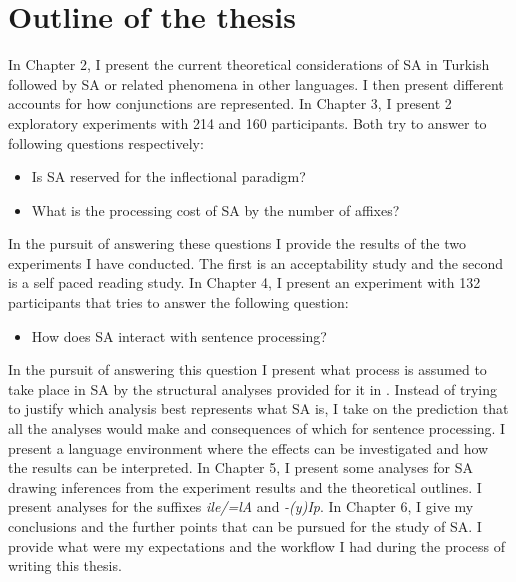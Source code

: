 \section{Outline of the thesis}

In Chapter 2, I present the current theoretical considerations of SA in Turkish followed by SA or related phenomena in other languages. I then present different accounts for how conjunctions are represented. In Chapter 3, I present 2 exploratory experiments with 214 and 160 participants. Both try to answer to following questions respectively:

\begin{itemize}
    \item Is SA reserved for the inflectional paradigm?
    \item What is the processing cost of SA by the number of affixes?
\end{itemize}

In the pursuit of answering these questions I provide the results of the two experiments I have conducted.
The first is an acceptability study and the second is a self paced reading study. In Chapter 4, I present an experiment with 132 participants that tries to answer the following question:
\begin{itemize}
    \item How does SA interact with sentence processing?
\end{itemize}
In the pursuit of answering this question I present what process is assumed to take place in SA by the structural analyses provided for it in \cite{broadwell2008turkish,kornfilt2012revisiting,guseva2017postsyntactic,erschler2018suspended}. Instead of trying to justify which analysis best represents what SA is, I take on the prediction that all the analyses would make and consequences of which for sentence processing. I present a language environment where the effects can be investigated and how the results can be interpreted. In Chapter 5, I present some analyses for SA drawing inferences from the experiment results and the theoretical outlines. I present analyses for the suffixes \textit{ile/=lA} and \textit{-(y)Ip}. In Chapter 6, I give my conclusions and the further points that can be pursued for the study of SA. I provide what were my expectations and the workflow I had during the process of writing this thesis. 